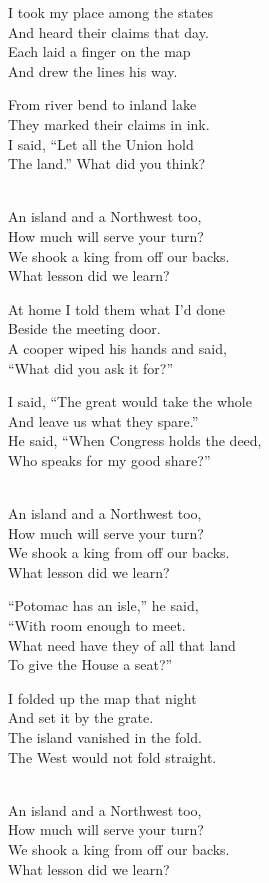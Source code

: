 \begin{lyrics}
I took my place among the states\\
And heard their claims that day.\\
Each laid a finger on the map\\
And drew the lines his way.

From river bend to inland lake\\
They marked their claims in ink.\\
I said, “Let all the Union hold\\
The land.” What did you think?

\\
An island and a Northwest too,\\
How much will serve your turn?\\
We shook a king from off our backs.\\
What lesson did we learn?

At home I told them what I’d done\\
Beside the meeting door.\\
A cooper wiped his hands and said,\\
“What did you ask it for?”

I said, “The great would take the whole\\
And leave us what they spare.”\\
He said, “When Congress holds the deed,\\
Who speaks for my good share?”

\\
An island and a Northwest too,\\
How much will serve your turn?\\
We shook a king from off our backs.\\
What lesson did we learn?

“Potomac has an isle,” he said,\\
“With room enough to meet.\\
What need have they of all that land\\
To give the House a seat?”

I folded up the map that night\\
And set it by the grate.\\
The island vanished in the fold.\\
The West would not fold straight.

\\
An island and a Northwest too,\\
How much will serve your turn?\\
We shook a king from off our backs.\\
What lesson did we learn?
\end{lyrics}

